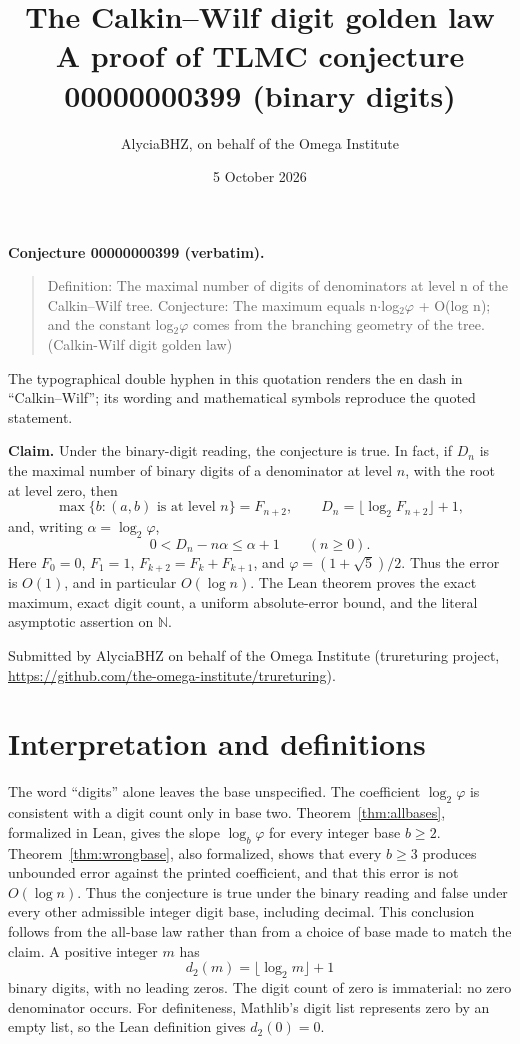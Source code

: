 \documentclass[11pt]{article}
\title{The Calkin--Wilf digit golden law\\
\large A proof of TLMC conjecture 00000000399 (binary digits)}
\author{AlyciaBHZ, on behalf of the Omega Institute}
\date{5 October 2026}
\newcommand{\ph}{\varphi}
\newcommand{\N}{\mathbb N}
\begin{document}
\maketitle

\textbf{Conjecture 00000000399 (verbatim).}
\begin{quote}
Definition: The maximal number of digits of denominators at level n of the
Calkin--Wilf tree. Conjecture: The maximum equals
n$\cdot$log$_2\ph$ + O(log n); and the constant log$_2\ph$ comes
from the branching geometry of the tree. (Calkin-Wilf digit golden law)
\end{quote}
The typographical double hyphen in this quotation renders the en dash in
``Calkin--Wilf''; its wording and mathematical symbols reproduce the quoted
statement.

\textbf{Claim.} Under the binary-digit reading, the conjecture is true.
In fact, if $D_n$ is the maximal number of binary digits of a denominator at
level $n$, with the root at level zero, then
\[
 \max\{b:(a,b)\text{ is at level }n\}=F_{n+2},\qquad
 D_n=\lfloor\log_2 F_{n+2}\rfloor+1,
\]
and, writing $\alpha=\log_2\ph$,
\begin{equation}\label{eq:strong}
 0<D_n-n\alpha\le\alpha+1\qquad(n\ge0).
\end{equation}
Here $F_0=0$, $F_1=1$, $F_{k+2}=F_k+F_{k+1}$, and
$\ph=(1+\sqrt5)/2$. Thus the error is $O(1)$, and in particular $O(\log n)$.
The Lean theorem proves the exact maximum, exact digit count, a uniform
absolute-error bound, and the literal asymptotic assertion on $\N$.

Submitted by AlyciaBHZ on behalf of the Omega Institute (trureturing project,
\url{https://github.com/the-omega-institute/trureturing}).

\section{Interpretation and definitions}
The word ``digits'' alone leaves the base unspecified. The coefficient
$\log_2\ph$ is consistent with a digit count only in base two.
Theorem~\ref{thm:allbases}, formalized in Lean, gives the slope $\log_b\ph$
for every integer base $b\ge2$. Theorem~\ref{thm:wrongbase}, also formalized,
shows that every $b\ge3$ produces unbounded error against the printed
coefficient, and that this error is not $O(\log n)$. Thus the conjecture is
true under the binary reading and false under every other admissible
integer digit base, including decimal. This conclusion follows from the
all-base law rather than from a choice of base made to match the claim.
A positive integer $m$ has
\[
 d_2(m)=\lfloor\log_2 m\rfloor+1
\]
binary digits, with no leading zeros. The digit count of zero is immaterial:
no zero denominator occurs. For definiteness, Mathlib's digit list represents
zero by an empty list, so the Lean definition gives $d_2(0)=0$.
\end{document}
